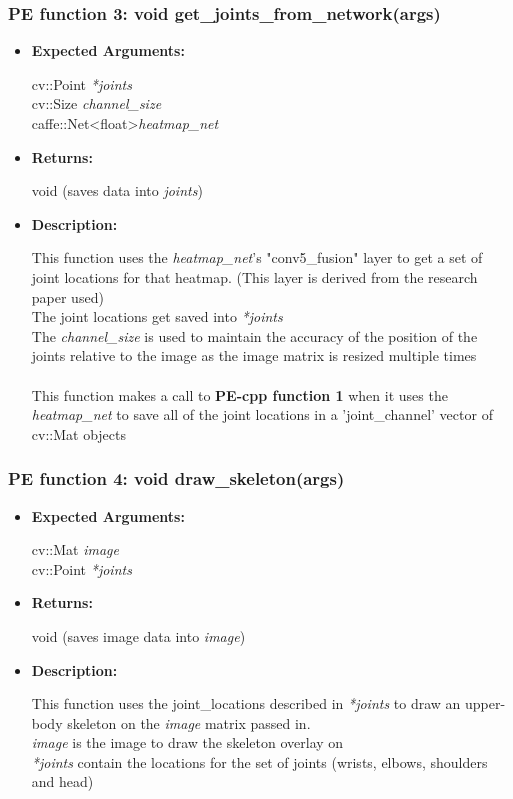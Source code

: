 \documentclass{scrreprt}
\begin{document}
\subsubsection{PE function 3: void get\_joints\_from\_network(args)}
\begin{itemize}
    \item \textbf{Expected Arguments:}

    cv::Point \quad\textit{*joints}
    \\
    cv::Size \quad\textit{channel\_size}
    \\
    caffe::Net\textless float\textgreater\quad\textit{heatmap\_net}

    \item \textbf{Returns:}

    void (saves data into \textit{joints})

    \item \textbf{Description:}

    This function uses the \textit{heatmap\_net}'s "conv5\_fusion" layer to get a set of joint locations for that heatmap. (This layer is derived from the research paper used)
    \\
    The joint locations get saved into \textit{*joints}
    \\
    The \textit{channel\_size} is used to maintain the accuracy of the position of the joints relative to the image as the image matrix is resized multiple times
    \\\\
    This function makes a call to \textbf{PE-cpp function 1} when it uses the \textit{heatmap\_net} to save all of the joint locations in a 'joint\_channel' vector of cv::Mat objects
\end{itemize}


\subsubsection{PE function 4: void draw\_skeleton(args)}
\begin{itemize}
    \item \textbf{Expected Arguments:}

    cv::Mat \quad\textit{image}
    \\
    cv::Point \quad\textit{*joints}

    \item \textbf{Returns:}

    void (saves image data into \textit{image})

    \item \textbf{Description:}

    This function uses the joint\_locations described in \textit{*joints} to draw an upper-body skeleton on the \textit{image} matrix passed in.
    \\
    \textit{image} is the image to draw the skeleton overlay on
    \\
    \textit{*joints} contain the locations for the set of joints (wrists, elbows, shoulders and head)
\end{itemize}
\end{document}
